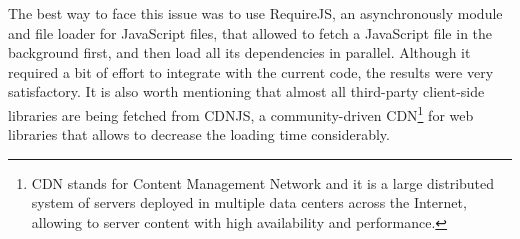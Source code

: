 The best way to face this issue was to use RequireJS, an asynchronously module and file loader for JavaScript files, that allowed to fetch a JavaScript file in the background first, and then load all its dependencies in parallel. Although it required a bit of effort to integrate with the current code, the results were very satisfactory. It is also worth mentioning that almost all third-party client-side libraries are being fetched from CDNJS, a community-driven CDN\footnote{CDN stands for Content Management Network and it is a large distributed system of servers deployed in multiple data centers across the Internet, allowing to server content with high availability and performance.} for web libraries that allows to decrease the loading time considerably.